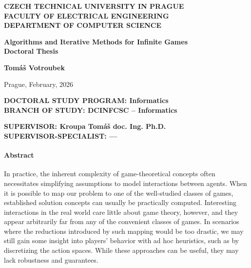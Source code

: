 
{\sffamily

\thispagestyle{empty}

\begin{flushleft}
\Large{\textbf{CZECH TECHNICAL UNIVERSITY IN PRAGUE}}\\
\Large{\textbf{FACULTY OF ELECTRICAL ENGINEERING}}\\
\Large{\textbf{DEPARTMENT OF COMPUTER SCIENCE}}
\end{flushleft}

\vspace*{1em}

\begin{flushleft}
\Large{\textbf{Algorithms and Iterative Methods for Infinite Games}}\\
\Large{\textbf{Doctoral Thesis}}
\end{flushleft}

\vspace*{1em}

\begin{flushleft}
\Large{\textbf{Tomáš Votroubek}}
\end{flushleft}

\vspace*{1em}

\begin{flushleft}
Prague, February, 2026\\
\end{flushleft}

\vspace*{1em}

\begin{flushleft}
\textbf{DOCTORAL STUDY PROGRAM: Informatics}\\
\textbf{BRANCH OF STUDY: DCINFCSC -- Informatics}
\end{flushleft}

\vspace*{1em}

\begin{flushleft}
\textbf{SUPERVISOR:  Kroupa Tomáš doc. Ing. Ph.D.}\\
\textbf{SUPERVISOR-SPECIALIST: ---}
\end{flushleft}

\pagebreak
\thispagestyle{empty}

{\small
\paragraph{Abstract}
In practice, the inherent complexity of game-theoretical concepts often necessitates simplifying assumptions to model interactions between agents. When it is possible to map our problem to one of the well-studied classes of games, established solution concepts can usually be practically computed. Interesting interactions in the real world care little about game theory, however, and they appear arbitrarily far from any of the convenient classes of games. In scenarios where the reductions introduced by such mapping would be too drastic, we may still gain some insight into players' behavior with ad hoc heuristics, such as by discretizing the action spaces. While these approaches can be useful, they may lack robustness and guarantees.

}}
